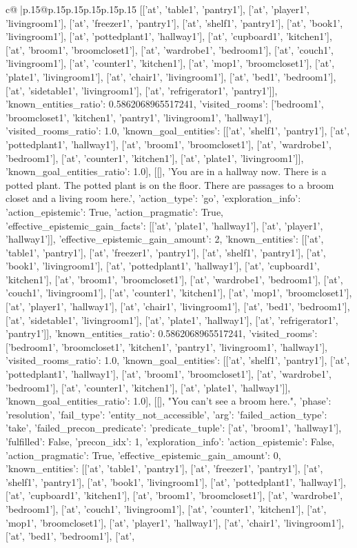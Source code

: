 \documentclass{article}
\begin{document}
{\begin{supertabular}{c@{$\;$}|p{.15\linewidth}@{}p{.15\linewidth}p{.15\linewidth}p{.15\linewidth}p{.15\linewidth}p{.15\linewidth}}
{{{[['at', 'table1', 'pantry1'], ['at', 'player1', 'livingroom1'], ['at', 'freezer1', 'pantry1'], ['at', 'shelf1', 'pantry1'], ['at', 'book1', 'livingroom1'], ['at', 'pottedplant1', 'hallway1'], ['at', 'cupboard1', 'kitchen1'], ['at', 'broom1', 'broomcloset1'], ['at', 'wardrobe1', 'bedroom1'], ['at', 'couch1', 'livingroom1'], ['at', 'counter1', 'kitchen1'], ['at', 'mop1', 'broomcloset1'], ['at', 'plate1', 'livingroom1'], ['at', 'chair1', 'livingroom1'], ['at', 'bed1', 'bedroom1'], ['at', 'sidetable1', 'livingroom1'], ['at', 'refrigerator1', 'pantry1']], 'known_entities_ratio': 0.5862068965517241, 'visited_rooms': ['bedroom1', 'broomcloset1', 'kitchen1', 'pantry1', 'livingroom1', 'hallway1'], 'visited_rooms_ratio': 1.0, 'known_goal_entities': [['at', 'shelf1', 'pantry1'], ['at', 'pottedplant1', 'hallway1'], ['at', 'broom1', 'broomcloset1'], ['at', 'wardrobe1', 'bedroom1'], ['at', 'counter1', 'kitchen1'], ['at', 'plate1', 'livingroom1']], 'known_goal_entities_ratio': 1.0}}], [[], 'You are in a hallway now. There is a potted plant. The potted plant is on the floor. There are passages to a broom closet and a living room here.', {'action_type': 'go', 'exploration_info': {'action_epistemic': True, 'action_pragmatic': True, 'effective_epistemic_gain_facts': [['at', 'plate1', 'hallway1'], ['at', 'player1', 'hallway1']], 'effective_epistemic_gain_amount': 2, 'known_entities': [['at', 'table1', 'pantry1'], ['at', 'freezer1', 'pantry1'], ['at', 'shelf1', 'pantry1'], ['at', 'book1', 'livingroom1'], ['at', 'pottedplant1', 'hallway1'], ['at', 'cupboard1', 'kitchen1'], ['at', 'broom1', 'broomcloset1'], ['at', 'wardrobe1', 'bedroom1'], ['at', 'couch1', 'livingroom1'], ['at', 'counter1', 'kitchen1'], ['at', 'mop1', 'broomcloset1'], ['at', 'player1', 'hallway1'], ['at', 'chair1', 'livingroom1'], ['at', 'bed1', 'bedroom1'], ['at', 'sidetable1', 'livingroom1'], ['at', 'plate1', 'hallway1'], ['at', 'refrigerator1', 'pantry1']], 'known_entities_ratio': 0.5862068965517241, 'visited_rooms': ['bedroom1', 'broomcloset1', 'kitchen1', 'pantry1', 'livingroom1', 'hallway1'], 'visited_rooms_ratio': 1.0, 'known_goal_entities': [['at', 'shelf1', 'pantry1'], ['at', 'pottedplant1', 'hallway1'], ['at', 'broom1', 'broomcloset1'], ['at', 'wardrobe1', 'bedroom1'], ['at', 'counter1', 'kitchen1'], ['at', 'plate1', 'hallway1']], 'known_goal_entities_ratio': 1.0}}], [[], "You can't see a broom here.", {'phase': 'resolution', 'fail_type': 'entity_not_accessible', 'arg': {'failed_action_type': 'take', 'failed_precon_predicate': {'predicate_tuple': ['at', 'broom1', 'hallway1'], 'fulfilled': False, 'precon_idx': 1}}, 'exploration_info': {'action_epistemic': False, 'action_pragmatic': True, 'effective_epistemic_gain_amount': 0, 'known_entities': [['at', 'table1', 'pantry1'], ['at', 'freezer1', 'pantry1'], ['at', 'shelf1', 'pantry1'], ['at', 'book1', 'livingroom1'], ['at', 'pottedplant1', 'hallway1'], ['at', 'cupboard1', 'kitchen1'], ['at', 'broom1', 'broomcloset1'], ['at', 'wardrobe1', 'bedroom1'], ['at', 'couch1', 'livingroom1'], ['at', 'counter1', 'kitchen1'], ['at', 'mop1', 'broomcloset1'], ['at', 'player1', 'hallway1'], ['at', 'chair1', 'livingroom1'], ['at', 'bed1', 'bedroom1'], ['at', }}}
\end{supertabular}}
\end{document}
